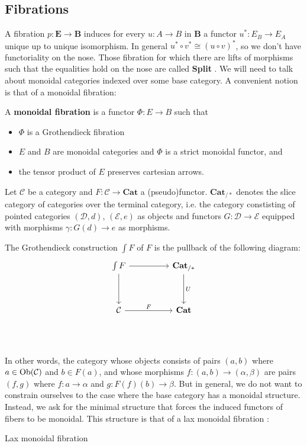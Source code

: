 \subsection{Fibrations}
A fibration $p : \mathbf{E} \to \mathbf{B}$ induces for every $u : A \to B$ in $\mathbf{B}$ a functor $u^*: E_B \to E_A$ unique up to unique isomorphism. In general $u^* \circ v^* \cong (u \circ v)^*$, so we don't have functoriality on the nose. Those fibration for which there are lifts of morphisms such that the equalities hold on the nose are called \textbf{Split }.
We will need to talk about monoidal categories indexed over some base category. A convenient notion is that of a monoidal fibration:
\begin{defn}
A \textbf{monoidal fibration} is a functor $\Phi\colon E\to B$ such that
\begin{itemize}
\item $\Phi$ is a Grothendieck fibration
\item $E$ and $B$ are monoidal categories and $\Phi$ is a strict monoidal functor, and
\item the tensor product of $E$ preserves cartesian arrows.
\end{itemize}
\end{defn}
Let $\mathcal{C}$ be a category and $F : \mathcal{C} \to \mathbf{Cat}$ a (pseudo)functor. $\textbf{Cat}_{/*}$ denotes the slice category of categories over the terminal category, i.e. the category constisting of pointed categories $(\mathcal{D}, d)$, $(\mathcal{E}, e)$ as objects and functors $G : \mathcal{D} \to \mathcal{E}$ equipped with morphisms $\gamma : G(d) \to e$ as morphisms.
\begin{defn}
The Grothendieck construction $\int F$ of $F$ is the pullback of the following diagram:
\[
\ti
\int F \ar[r] \ar[d] & \textbf{Cat}_{/*} \ar[d, "U"] \\
\mathcal{C} \ar[r, "F"] & \textbf{Cat} \\
\kz
\]
\end{defn}
In other words, the category whose objects consists of pairs $(a, b)$ where $a \in \operatorname{\text{Ob}}(\mathcal{C})$ and $b \in F(a)$, and whose morphisms $f : (a, b) \to (\alpha, \beta)$ are pairs $(f, g)$ where $f: a \to \alpha$ and $g : F(f)(b) \to \beta$.
But in general, we do not want to constrain ourselves to the case where the base category has a monoidal structure. Instead, we ask for the minimal structure that forces the induced functors of fibers to be monoidal. This structure is that of a lax monoidal fibration \cite{zawadowski}:
\begin{defn}
Lax monoidal fibration
\end{defn}
